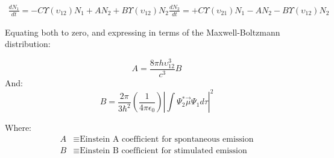 \documentclass[12pt]{article}
\begin{document}
\begin{align*}
    \frac{dN_1}{dt} = -C\Upsilon(\upsilon_{12})N_1 + AN_2 + B\Upsilon(\upsilon_{12})N_2
    \frac{dN_2}{dt} = +C\Upsilon(\upsilon_{21})N_1 - AN_2 - B\Upsilon(\upsilon_{12})N_2
\end{align*}

Equating both to zero, and expressing in terms of the Maxwell-Boltzmann distribution:

\[A = \frac{8\pi h \upsilon^3_{12}}{c^3}B\]
And:
\[B = \frac{2\pi}{3\hbar^2}\left(\frac{1}{4\pi\epsilon_0}\right)\left|\int\Psi^*_2\vec{\mu}\Psi_1d\tau\right|^2\]

Where:
\begin{align*}
    A &\equiv \text{Einstein A coefficient for spontaneous emission}\\
    B &\equiv \text{Einstein B coefficient for stimulated emission}
\end{align*}
\end{document}
